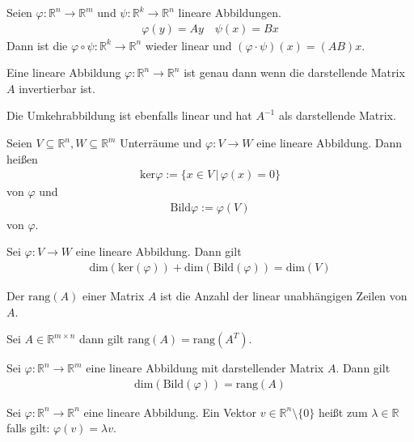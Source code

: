 
Seien $\varphi : \mathbb{R}^n \rightarrow \mathbb{R}^m$ und $\psi : \mathbb{R}^k \rightarrow \mathbb{R}^n$ lineare Abbildungen.
\begin{align*}
	\varphi(y) = Ay \quad \psi(x) = Bx
\end{align*}
Dann ist die  $\varphi \circ \psi : \mathbb{R}^k \rightarrow \mathbb{R}^n$ wieder linear und $(\varphi \cdot \psi)(x) = (AB)x$.

Eine lineare Abbildung $\varphi : \mathbb{R}^n \rightarrow \mathbb{R}^n$ ist  genau dann wenn die darstellende Matrix $A$ invertierbar ist.

Die Umkehrabbildung ist ebenfalls linear und hat $A^{-1}$ als darstellende Matrix.

Seien $V \subseteq \mathbb{R}^n, W \subseteq \mathbb{R}^m$ Unterräume und $\varphi : V \rightarrow W$ eine lineare Abbildung. Dann heißen
\begin{align*}
	\text{ker}\varphi := \{x \in V\,|\,\varphi(x) = 0\}
\end{align*}
 von $\varphi$ und
\begin{align*}
	\text{Bild}\varphi := \varphi(V)
\end{align*}
 von $\varphi$.

Sei $\varphi : V \rightarrow W$ eine lineare Abbildung. Dann gilt
\begin{align*}
	\text{dim}\left(\text{ker}(\varphi)\right) + \text{dim}\left(\text{Bild}(\varphi)\right) = \text{dim}(V)
\end{align*}

Der  $\text{rang}(A)$ einer Matrix $A$ ist die Anzahl der linear unabhängigen Zeilen von $A$.

Sei $A \in \mathbb{R}^{m \times n}$ dann gilt $\text{rang}(A) = \text{rang}(A^T)$.

Sei $\varphi : \mathbb{R}^n \rightarrow \mathbb{R}^m$ eine lineare Abbildung mit darstellender Matrix $A$. Dann gilt
\begin{align*}
	\text{dim}\left(\text{Bild}(\varphi)\right) = \text{rang}(A)
\end{align*}

Sei $\varphi : \mathbb{R}^n \rightarrow \mathbb{R}^n$ eine lineare Abbildung. Ein Vektor $v \in \mathbb{R}^n \setminus \{0\}$ heißt  zum  $\lambda \in \mathbb{R}$ falls gilt: $\varphi(v) = \lambda v$.


